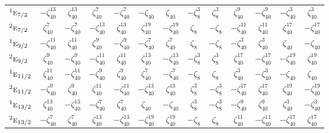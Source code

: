\documentclass[10pt,a4paper]{article}
\numberwithin{equation}{section}
\newcommand{\irr}[1]{\text{\normalfont\scshape #1}}
\newcommand{\conjpair}[1]{{}^{#1}}
\newcommand{\rootunity}[1]{\zeta_{#1}}
\begin{document}
{\begin{longtable}{@{}lcccccccccccc@{}}
$\conjpair{1}\irr{e}_{7/2}$ & $-\rootunity{40}^{13}$ & $\rootunity{40}^{13}$ & $\rootunity{40}^{7}$ & $-\rootunity{40}^{7}$ & $-\rootunity{40}$ & $\rootunity{40}$ & $-\rootunity{8}^{3}$ & $\rootunity{8}^{3}$ & $\rootunity{40}^{9}$ & $-\rootunity{40}^{9}$ & $-\rootunity{40}^{3}$ & $\rootunity{40}^{3}$\\
$\conjpair{2}\irr{e}_{7/2}$ & $\rootunity{40}^{7}$ & $-\rootunity{40}^{7}$ & $-\rootunity{40}^{13}$ & $\rootunity{40}^{13}$ & $\rootunity{40}^{19}$ & $-\rootunity{40}^{19}$ & $\rootunity{8}$ & $-\rootunity{8}$ & $-\rootunity{40}^{11}$ & $\rootunity{40}^{11}$ & $\rootunity{40}^{17}$ & $-\rootunity{40}^{17}$\\
$\conjpair{1}\irr{e}_{9/2}$ & $-\rootunity{40}^{11}$ & $\rootunity{40}^{11}$ & $\rootunity{40}^{9}$ & $-\rootunity{40}^{9}$ & $-\rootunity{40}^{7}$ & $\rootunity{40}^{7}$ & $\rootunity{8}$ & $-\rootunity{8}$ & $-\rootunity{40}^{3}$ & $\rootunity{40}^{3}$ & $\rootunity{40}$ & $-\rootunity{40}$\\
$\conjpair{2}\irr{e}_{9/2}$ & $\rootunity{40}^{9}$ & $-\rootunity{40}^{9}$ & $-\rootunity{40}^{11}$ & $\rootunity{40}^{11}$ & $\rootunity{40}^{13}$ & $-\rootunity{40}^{13}$ & $-\rootunity{8}^{3}$ & $\rootunity{8}^{3}$ & $\rootunity{40}^{17}$ & $-\rootunity{40}^{17}$ & $-\rootunity{40}^{19}$ & $\rootunity{40}^{19}$\\
$\conjpair{1}\irr{e}_{11/2}$ & $\rootunity{40}^{11}$ & $-\rootunity{40}^{11}$ & $-\rootunity{40}^{9}$ & $\rootunity{40}^{9}$ & $\rootunity{40}^{7}$ & $-\rootunity{40}^{7}$ & $-\rootunity{8}$ & $\rootunity{8}$ & $\rootunity{40}^{3}$ & $-\rootunity{40}^{3}$ & $-\rootunity{40}$ & $\rootunity{40}$\\
$\conjpair{2}\irr{e}_{11/2}$ & $-\rootunity{40}^{9}$ & $\rootunity{40}^{9}$ & $\rootunity{40}^{11}$ & $-\rootunity{40}^{11}$ & $-\rootunity{40}^{13}$ & $\rootunity{40}^{13}$ & $\rootunity{8}^{3}$ & $-\rootunity{8}^{3}$ & $-\rootunity{40}^{17}$ & $\rootunity{40}^{17}$ & $\rootunity{40}^{19}$ & $-\rootunity{40}^{19}$\\
$\conjpair{1}\irr{e}_{13/2}$ & $\rootunity{40}^{13}$ & $-\rootunity{40}^{13}$ & $-\rootunity{40}^{7}$ & $\rootunity{40}^{7}$ & $\rootunity{40}$ & $-\rootunity{40}$ & $\rootunity{8}^{3}$ & $-\rootunity{8}^{3}$ & $-\rootunity{40}^{9}$ & $\rootunity{40}^{9}$ & $\rootunity{40}^{3}$ & $-\rootunity{40}^{3}$\\
$\conjpair{2}\irr{e}_{13/2}$ & $-\rootunity{40}^{7}$ & $\rootunity{40}^{7}$ & $\rootunity{40}^{13}$ & $-\rootunity{40}^{13}$ & $-\rootunity{40}^{19}$ & $\rootunity{40}^{19}$ & $-\rootunity{8}$ & $\rootunity{8}$ & $\rootunity{40}^{11}$ & $-\rootunity{40}^{11}$ & $-\rootunity{40}^{17}$ & $\rootunity{40}^{17}$\\

\end{longtable}}
\end{document}
